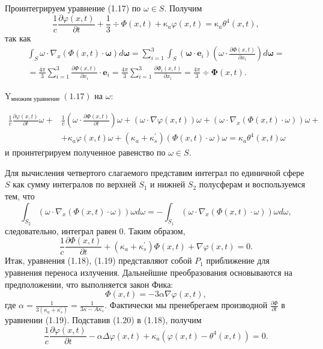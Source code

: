 Проинтегрируем уравнение (1.17) по $\omega \in S$.
Получим
\[
    \frac{1}{c} \frac{\partial \varphi(x, t)}{\partial t}+\frac{1}{3} \div \Phi(x, t)+\mathrm{\kappa}_{a}
    \varphi(x, t)=\mathrm{\kappa}_{a} \theta^{4}(x, t),
\]
так как
\[
    \begin{gathered}
        \int_{S} \omega \cdot \nabla_{x}(\Phi(x, t) \cdot \boldsymbol{\omega}) d \boldsymbol{\omega}=\sum_{i=1}^{3}
        \int_{S}\left(\boldsymbol{\omega} \cdot \mathbf{e}_{i}\right)\left(\omega \cdot
        \frac{\partial \Phi(x, t)}{\partial x_{i}}\right) d \boldsymbol{\omega}= \\
        =\frac{4 \pi}{3} \sum_{i=1}^{3} \frac{\partial \Phi(x, t)}{\partial x_{i}} \cdot
        \mathbf{e}_{i}=\frac{4 \pi}{3} \sum_{i=1}^{3} \frac{\partial \Phi_{i}(x, t)}{\partial x_{i}}=
        \frac{4 \pi}{3} \div \boldsymbol{\Phi}(x, t).
    \end{gathered}
\]

$\mathrm{Y}_{\text {множим уравнение }}(1.17)$ на $\omega:$

\[
    \begin{aligned}
        \frac{1}{c} \frac{\partial \varphi(x, t)}{\partial t} \omega+&
        \frac{1}{c}\left(\omega \cdot \frac{\partial \Phi(x, t)}{\partial t}\right)
        \omega+(\omega \cdot \nabla \varphi(x, t)) \omega+\left(\omega \cdot \nabla_{x}(\Phi(x, t)
        \cdot \omega)\right) \omega+\\
        &+\kappa_{a} \varphi(x, t) \omega+\left(\kappa_{a}+\kappa_{s}^{\prime}\right)(\Phi(x, t)
        \cdot \omega) \omega=\kappa_{a} \theta^{4}(x, t) \omega
    \end{aligned}
\]
и проинтегрируем полученное равенство по $\omega \in S$.


Для вычисления четвертого слагаемого представим интеграл по единичной сфере $S$
как сумму интегралов по верхней $S_{1}$ и нижней $S_{2}$ полусферам и воспользуемся тем, что
\[
    \int_{S_{2}}\left(\omega \cdot \nabla_{x}(\Phi(x, t) \cdot \omega)\right) \omega d
    \omega=-\int_{S_{1}}\left(\omega \cdot \nabla_{x}(\Phi(x, t) \cdot \omega)\right) \omega d \omega,
\]
следовательно, интеграл равен 0. Таким образом,
\[
    \frac{1}{c} \frac{\partial \Phi(x, t)}{\partial t}+\left(\kappa_{a}+\kappa_{s}^{\prime}\right)
    \Phi(x, t)+\nabla \varphi(x, t)=0.
\]
Итак, уравнения (1.18), (1.19) представляют собой $P_{1}$ приближение для уравнения переноса излучения.
Дальнейшие преобразования основываются на предположении, что выполняется закон Фика:
\[
    \Phi(x, t)=-3 \alpha \nabla \varphi(x, t),
\]
где $\alpha=\frac{1}{3\left(\kappa_{a}+\kappa_{s}^{\prime}\right)}=\frac{1}{3 \kappa-A \kappa_{s}}$.
Фактически мы пренебрегаем производной $\frac{\partial \Phi}{\partial t}$ в уравнении (1.19).
Подставив (1.20) в (1.18), получим
\[
    \frac{1}{c} \frac{\partial \varphi(x, t)}{\partial t}-\alpha \Delta
    \varphi(x, t)+\kappa_{a}\left(\varphi(x, t)-\theta^{4}(x, t)\right)=0 .
\]


